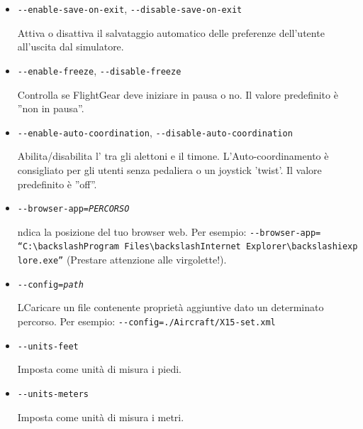 {\begin{itemize}
  \item{\texttt{-$ $-enable-save-on-exit}, \texttt{-$ $-disable-save-on-exit}}

    Attiva o disattiva il salvataggio automatico delle preferenze
    dell'utente all'uscita dal simulatore.

  \item{\texttt{-$ $-enable-freeze}, \texttt{-$ $-disable-freeze}}

    Controlla se FlightGear deve iniziare in pausa o no. Il valore
    predefinito \`{e} ''non in pausa''.

  \item{\texttt{-$ $-enable-auto-coordination}, \texttt{-$ $-disable-auto-coordination}}

    Abilita/disabilita l' tra gli alettoni e il timone.
    L'Auto-coordinamento \`{e} consigliato per gli utenti senza pedaliera
    o un joystick 'twist'. Il valore predefinito \`{e} ''off''.

  \item{\texttt{-$ $-browser-app={\it PERCORSO}}}

    ndica la posizione del tuo browser web. Per esempio:
    \texttt{-$ $-browser-app=}\\
    \texttt{``C:$\backslash$Program~Files$\backslash$Internet~Explorer$\backslash$iexplore.exe''}
    (Prestare attenzione alle virgolette!).

  \item{\texttt{-$ $-config={\it path}}}

    LCaricare un file contenente propriet\`{a} aggiuntive dato un determinato percorso. Per esempio:
    \texttt{-$ $-config=./Aircraft/X15-set.xml}

  \item{\texttt{-$ $-units-feet}}

    Imposta come unit\`{a} di misura i piedi.

  \item{\texttt{-$ $-units-meters}}

    Imposta come unit\`{a} di misura i metri.


  \end{itemize}
}
